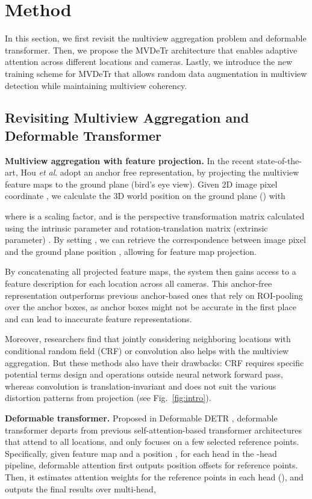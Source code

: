 \documentclass[sigconf,authorversion,nonacm]{acmart}
\newcommand{\etal}{\textit{et al}. }
\begin{document}
\section{Method}
In this section, we first revisit the multiview aggregation problem and deformable transformer. Then, we propose the MVDeTr architecture that enables adaptive attention across different locations and cameras. Lastly, we introduce the new training scheme for MVDeTr that allows random data augmentation in multiview detection while maintaining multiview coherency. 


\subsection{Revisiting Multiview Aggregation and Deformable Transformer}

\textbf{Multiview aggregation with feature projection.} In the recent state-of-the-art, Hou \etal \cite{hou2020multiview} adopt an anchor free representation, by projecting the multiview feature maps to the ground plane (bird's eye view). Given 2D image pixel coordinate , we calculate the 3D world position  on the ground plane () with 

where  is a scaling factor, and  is the perspective transformation matrix calculated using the intrinsic parameter  and rotation-translation matrix (extrinsic parameter) . By setting , we can retrieve the correspondence between image pixel  and the ground plane position , allowing for feature map projection. 

By concatenating all projected feature maps, the system then gains access to a feature description for each location across all cameras. This anchor-free representation outperforms previous anchor-based ones \cite{baque2017deep,chavdarova2017deep} that rely on ROI-pooling \cite{ren2015faster} over the anchor boxes, as anchor boxes might not be accurate in the first place and can lead to inaccurate feature representations. 


Moreover, researchers find that jointly considering neighboring locations with conditional random field (CRF) \cite{baque2017deep} or convolution \cite{hou2020multiview} also helps with the multiview aggregation. But these methods also have their drawbacks: CRF requires specific potential terms design and operations outside neural network forward pass, whereas convolution is translation-invariant and does not suit the various distortion patterns from projection (see Fig.~\ref{fig:intro}). 

\textbf{Deformable transformer.} Proposed in Deformable DETR \cite{zhu2021deformable}, deformable transformer departs from previous self-attention-based transformer architectures \cite{vaswani2017attention} that attend to all locations, and only focuses on a few selected reference points. Specifically, given feature map  and a position , for each head  in the -head pipeline, deformable attention first outputs position offsets  for  reference points. Then, it estimates attention weights  for the reference points  in each head (), and outputs the final results over multi-head,
\end{document}

